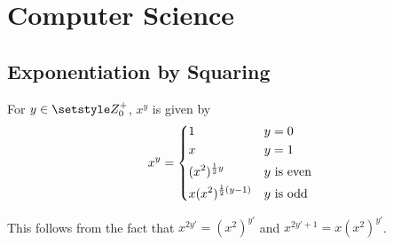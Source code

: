 \section{Computer Science}

\subsection{Exponentiation by Squaring} \label{sec_exp_by_squaring}


For \(y \in \Integers_0^+\), \(x^y\) is given by
\begin{equation}
 x^y =
  \begin{dcases}
   1 & y = 0 \\
   x & y = 1 \\
   (x^2)^{\frac 12 y} & \text{\(y\) is even} \\
   x(x^2)^{\frac 12 (y - 1)} & \text{\(y\) is odd} \\
  \end{dcases}
\end{equation}

This follows from the fact that
\(x^{2y'} = (x^2)^{y'}\) and \(x^{2y' + 1} = x(x^2)^{y'}\).
